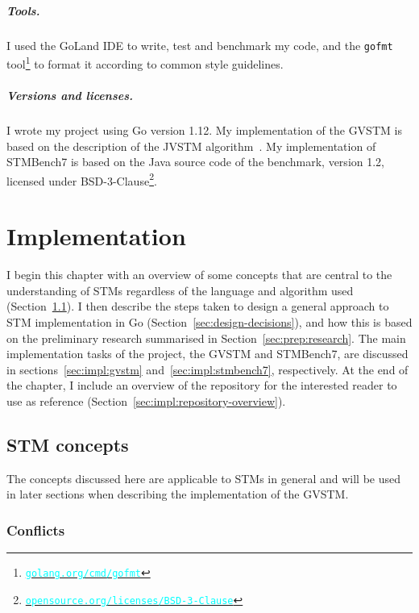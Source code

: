 \documentclass[12pt,a4paper,oneside,openright]{report}
\newcommand{\URL}[1]{\href{https://#1}{\textcolor{cyan}{\texttt{#1}}}}
\begin{document}
\paragraph{Tools.} I used the GoLand IDE to write, test and benchmark
my code, and the \texttt{gofmt}
tool\footnote{\URL{golang.org/cmd/gofmt}} to format it according to
common style guidelines.

\paragraph{Versions and licenses.} I wrote my project using Go version
1.12. My implementation of the GVSTM is based on the description of
the JVSTM algorithm~\cite{cachopo2007phd}. My implementation of
STMBench7 is based on the Java source code of the benchmark, version
1.2, licensed under
BSD-3-Clause\footnote{\URL{opensource.org/licenses/BSD-3-Clause}}.




\chapter{Implementation}

I begin this chapter with an overview of some concepts that are
central to the understanding of STMs regardless of the language and
algorithm used (Section~\ref{sec:stm-concepts}). I then describe the
steps taken to design a general approach to STM implementation in Go
(Section~\ref{sec:design-decisions}), and how this is based on the
preliminary research summarised in
Section~\ref{sec:prep:research}. The main implementation tasks of the
project, the GVSTM and STMBench7, are discussed in
sections~\ref{sec:impl:gvstm} and~\ref{sec:impl:stmbench7},
respectively. At the end of the chapter, I include an overview of the
repository for the interested reader to use as reference
(Section~\ref{sec:impl:repository-overview}).

\section{STM concepts}
\label{sec:stm-concepts}

The concepts discussed here are applicable to STMs in general and will
be used in later sections when describing the implementation of the
GVSTM.

\subsection{Conflicts}
\label{sec:impl:conflicts}
\end{document}
